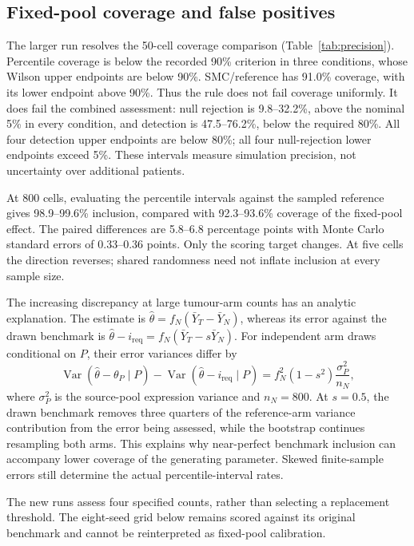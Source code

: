 \subsection{Fixed-pool coverage and false positives}
\label{sec:fixedpool}\label{sec:lowcounts}
The larger run resolves the 50-cell coverage comparison
(Table~\ref{tab:precision}). Percentile coverage is below the recorded 90\%
criterion in three conditions, whose Wilson upper endpoints are below 90\%.
SMC/reference has 91.0\% coverage, with its lower endpoint above 90\%.
Thus the rule does not fail coverage uniformly. It does fail the combined
assessment: null rejection is 9.8--32.2\%, above the nominal 5\% in every
condition, and detection is 47.5--76.2\%, below the required 80\%.
All four detection upper endpoints are below 80\%; all four null-rejection
lower endpoints exceed 5\%. These intervals measure simulation precision,
not uncertainty over additional patients.



At 800 cells, evaluating the percentile intervals against the sampled
reference gives 98.9--99.6\% inclusion, compared with 92.3--93.6\%
coverage of the fixed-pool effect. The paired differences are 5.8--6.8
percentage points with Monte Carlo standard errors of 0.33--0.36 points.
Only the scoring target changes. At five cells the direction reverses;
shared randomness need not inflate inclusion at every sample size.

The increasing discrepancy at large tumour-arm counts has an analytic
explanation. The estimate is $\hat\theta=f_N(\bar Y_T-\bar Y_N)$, whereas
its error against the drawn benchmark is
$\hat\theta-i_{\mathrm{req}}=f_N(\bar Y_T-s\bar Y_N)$.
For independent arm draws conditional on $P$, their error variances differ by
\begin{equation}
\operatorname{Var}(\hat\theta-\theta_P\mid P)
-\operatorname{Var}(\hat\theta-i_{\mathrm{req}}\mid P)
=f_N^2(1-s^2)\frac{\sigma_P^2}{n_N},
\label{eq:variancegap}
\end{equation}
where $\sigma_P^2$ is the source-pool expression variance and $n_N=800$.
At $s=0.5$, the drawn benchmark removes three quarters of the reference-arm
variance contribution from the error being assessed, while the bootstrap
continues resampling both arms. This explains why near-perfect benchmark
inclusion can accompany lower coverage of the generating parameter. Skewed
finite-sample errors still determine the actual percentile-interval rates.

The new runs assess four specified counts, rather than selecting a
replacement threshold. The eight-seed grid below remains scored against
its original benchmark and cannot be reinterpreted as fixed-pool calibration.
